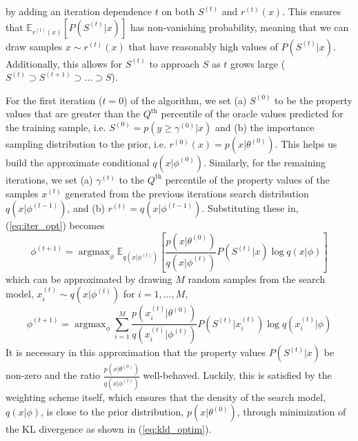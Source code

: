\documentclass{article}
\DeclareMathOperator*{\argmax}{argmax}
\begin{document}
%
by adding an iteration dependence $t$ on both $S^{(t)}$ and $r^{(t)}(x)$. This
ensures that $\mathbb{E}_{r^{(t)}(x)} [P(S^{(t)}|x)]$ has non-vanishing
probability, meaning that we can draw samples $x \sim r^{(t)}(x)$ that have
reasonably high values of $P(S^{(t)}|x)$. Additionally, this allows for
$S^{(t)}$ to approach $S$ as $t$ grows large ($S^{(t)} \supset S^{(t+1)} \supset
\dots \supset S$). 

For the first iteration ($t=0$) of the algorithm, we set (a) $S^{(0)}$ to be the
property values that are greater than the $Q^{\text{th}}$ percentile of the
oracle values predicted for the training sample, i.e. $S^{(0)} = p(y \geq
\gamma^{(0)} | x)$ and (b) the importance sampling distribution to the prior,
i.e. $r^{(0)}(x) = p(x|\theta^{(0)})$. This helps us build the approximate
conditional $q(x|\phi^{(0)})$. Similarly, for the remaining iterations, we set
(a) $\gamma^{(t)}$ to the $Q^{\text{th}}$ percentile of the property values of
the samples $x^{(t)}$ generated from the previous iterations search distribution
$q(x|\phi^{(t-1)})$, and (b) $r^{(t)} = q(x|\phi^{(t-1)})$. Substituting these
in, (\ref{eq:iter_opt}) becomes
%
\begin{equation}
  \phi^{(t+1)} = \argmax_{\phi} \mathbb{E}_{q(x|\phi^{(t)})} \left[
    \frac{p(x|\theta^{(0)})}{q(x|\phi^{(t)})} P(S^{(t)}|x) \log q(x|\phi)
  \right] \label{eq:final_exact_opt}
\end{equation}
%
which can be approximated by drawing $M$ random samples from the search model,
$x_{i}^{(t)} \sim q(x|\phi^{(t)})$ for $i = 1, \dots, M$,
%
\begin{equation}
  \phi^{(t+1)} = \argmax_{\phi} \sum_{i=1}^{M} \frac{p(x_{i}^{(t)}|\theta^{(0)})}{
    q(x_{i}^{(t)}|\phi^{(t)})} P(S^{(t)} | x_{i}^{(t)}) \log q(x_{i}^{(t)} | \phi)
  \label{eq:final_approx_opt}
\end{equation}
%
It is necessary in this approximation that the property values $P(S^{(t)}|x)$ be
non-zero and the ratio $\frac{p(x | \theta^{(0)})}{q(x | \phi^{(t)})}$
well-behaved. Luckily, this is satisfied by the weighting scheme itself, which
ensures that the density of the search model, $q(x|\phi)$, is close to the prior
distribution, $p(x|\theta^{(0)})$, through minimization of the KL divergence as
shown in (\ref{eq:kld_optim}). 
\end{document}
